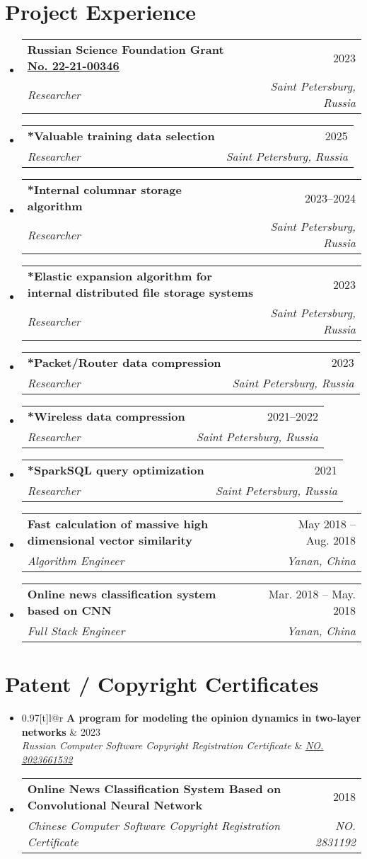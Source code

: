 \documentclass[letterpaper,10pt]{article}
\makeatletter
\newcommand{\link}[2]{\href{#1}{\color{blue}\underline{#2}}}
\newcommand{\resumeSubheading}[4]{
  \vspace{-2pt}\item
  \begin{tabular*}{0.97\textwidth}[t]{l@{\extracolsep{\fill}}r}
    \textbf{#1} & #2 \\
    \textit{\small#3} & \textit{\small #4} \\
  \end{tabular*}\vspace{-7pt}
}
\newenvironment{resumeSubHeadingList}{\begin{itemize}[leftmargin=0.15in, label={}]}{\end{itemize}}
\makeatother
\begin{document}
\section{Project Experience}
\begin{resumeSubHeadingList}
  \resumeSubheading
    {Russian Science Foundation Grant \link{https://rscf.ru/en/project/22-21-00346/}{No. 22-21-00346}}{2023}
       {Researcher}{Saint Petersburg, Russia}
  \resumeSubheading
    {*Valuable training data selection}{2025}
       {Researcher}{Saint Petersburg, Russia}
  \resumeSubheading
    {*Internal columnar storage algorithm}{2023--2024}
       {Researcher}{Saint Petersburg, Russia}
  \resumeSubheading
    {*Elastic expansion algorithm for internal distributed file storage systems}{2023}
       {Researcher}{Saint Petersburg, Russia}
  \resumeSubheading
    {*Packet/Router data compression}{2023}
       {Researcher}{Saint Petersburg, Russia}
  \resumeSubheading
    {*Wireless data compression}{2021--2022}
       {Researcher}{Saint Petersburg, Russia}
  \resumeSubheading
    {*SparkSQL query optimization}{2021}
       {Researcher}{Saint Petersburg, Russia}
  \resumeSubheading 
  {Fast calculation of massive high dimensional vector similarity}{May 2018 -- Aug. 2018}
  {Algorithm Engineer}{Yanan, China}


\resumeSubheading
    {Online news classification system based on CNN}{Mar. 2018 -- May. 2018}
    {Full Stack Engineer}{Yanan, China}

\end{resumeSubHeadingList}

\section{Patent / Copyright Certificates}
\begin{resumeSubHeadingList}
  \resumeSubheading
    {A program for modeling the opinion dynamics in two-layer networks}{2023}
    {Russian Computer Software Copyright Registration Certificate}{{\link{https://new.fips.ru/registers-doc-view/fips_servlet?DB=EVM&DocNumber=2023661532&TypeFile=html}{NO.
      2023661532}}}

  \resumeSubheading
    {Online News Classification System Based on Convolutional Neural Network}{2018}
    {Chinese Computer Software Copyright Registration Certificate}{NO. 2831192}
\end{resumeSubHeadingList}
\end{document}
